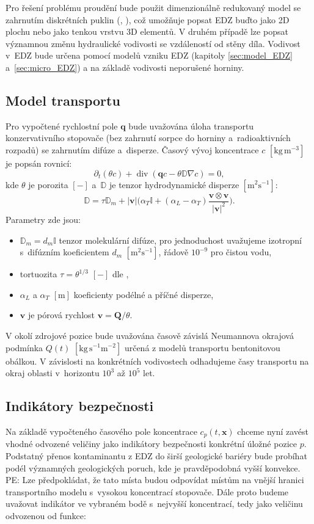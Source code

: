 \documentclass{article}
\def\abs#1{\lvert#1\rvert}
\def\prtl{\partial}
\def\unit#1{\mathrm{#1}}
\def\grad{\nabla}
\def\div{\operatorname{div}}
\def\vc#1{\mathbf{\boldsymbol{#1}}}     %
\def\tn#1{{\mathbb{#1}}}    %
\newcommand{\pe}[1]{{\color{orange} PE: #1}}
\begin{document}
Pro řešení problému proudění bude použit dimenzionálně redukovaný model se zahrnutím diskrétních puklin (\cite{brezina_analysis_2015}, \cite{flow123d}),
což umožňuje popsat EDZ buďto jako 2D plochu nebo jako tenkou vrstvu 3D elementů.
V druhém případě lze popsat významnou změnu hydraulické vodivosti se vzdáleností od stěny díla.
Vodivost v~EDZ bude určena pomocí modelů vzniku EDZ (kapitoly \ref{sec:model_EDZ} a~\ref{sec:micro_EDZ}) 
a na základě vodivosti neporušené horniny.



\subsection{Model transportu}
\label{sec:stopovac}
Pro vypočtené rychlostní pole $\vc q$ bude uvažována úloha transportu konzervativního stopovače (bez zahrnutí sorpce do horniny a~radioaktivních rozpadů) 
se zahrnutím difúze a~disperze. Časový vývoj koncentrace $c$ $[\unit{kg\, m^{-3}}]$ je popsán rovnicí:
\[
   \prtl_t (\theta c) + \div( \vc q c - \theta \tn D \grad c) = 0,
\]
kde $\theta$ je porozita $[-]$ a~$\tn D$ je tenzor hydrodynamické disperze $[\unit{m^2s^{-1}}]$:
\[
  \tn D = \tau\tn D_m + \abs{\vc v}\Big(\alpha_T \tn I + (\alpha_L - \alpha_T)\frac{\vc v \otimes \vc v}{\abs{\vc v}^2}\Big).
\]
Parametry zde jsou:
\begin{itemize}
 \item $\tn D_m = d_m \tn I$ tenzor molekulární difúze, pro jednoduchost uvažujeme izotropní s~difúzním koeficientem $d_m$ $[\unit{m^2s^{-1}}]$, řádově $10^{-9}$ pro čistou vodu,
 \item tortuozita $\tau=\theta^{1/3}$ $[-]$ dle \cite{millington_quirk},
 \item $\alpha_L$ a $\alpha_T$ $[\unit{m}]$ koeficienty podélné a příčné disperze,
 \item $\vc v$ je pórová rychlost $\vc v = \vc Q / \theta$.
\end{itemize}

V okolí zdrojové pozice bude uvažována časově závislá Neumannova okrajová podmínka $Q(t)$ $[\unit{kg\, s^{-1}m^{-2}}]$
určená z modelů transportu bentonitovou obálkou. V závislosti na konkrétních vodivostech odhadujeme časy 
transportu na okraj oblasti v~horizontu $10^3$ až $10^5$ let. 



\subsection{Indikátory bezpečnosti}
\label{sec:indikatory}
Na základě vypočteného časového pole koncentrace $c_p(t, \vc x)$ chceme nyní zavést vhodné odvozené veličiny jako indikátory bezpečnosti 
konkrétní úložné pozice $p$. Podstatný přenos kontaminantu z EDZ do širší geologické bariéry bude probíhat podél významných geologických poruch, 
kde je pravděpodobná vyšší konvekce. 
\pe{Lze předpokládat, že tato místa budou odpovídat místům na vnější hranici transportního modelu s~vysokou koncentrací stopovače. 
Dále proto budeme uvažovat indikátor ve vybraném bodě s~nejvyšší koncentrací, tedy jako veličinu odvozenou od funkce:}
\end{document}
